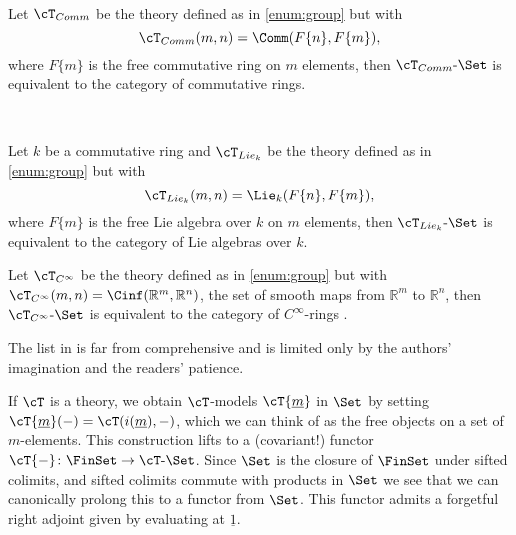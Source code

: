 \documentclass[leqno,oneside,english]{elsarticle}
\newcounter{enumisaved}
\newlength{\thmsaved}
\newlength{\thmnow}
\begin{document}
\begin{example}
\begin{enumerate}
{{{    \setcounter{thm}{{\strip@pt{\thmsaved}}}  
  }{
    
  }
  \setcounter{enumi}{\theenumisaved}
    \else  \fi
}}{}
  
    {{    {}  \ifshowcomplete
  \ 
  { \item Let $\cT_{Comm}$ be the theory defined as in \eqref{enum:group}
      but with 
      \[
      \cT_{Comm}(m,n)=\Comm(F\{n\},F\{m\}),
      \]
      where $F\{m\}$ is the free commutative ring on $m$ elements, then
      ${{\cT_{Comm}}\text{-}{\Set}}$ is equivalent to the category of commutative
      rings.
}
  {}
  \ 
  \ifthenelse{\lengthtest{\thmnow > \thmsaved}}{
    
    \setcounter{thm}{{\strip@pt{\thmsaved}}}  
  }{
    
  }
  \setcounter{enumi}{\theenumisaved}
    \else  \fi
}}{}
    
    \item Let $k$ be a commutative ring and $\cT_{Lie_k}$ be the theory
      defined as in \eqref{enum:group} but with 
      \[
      \cT_{Lie_k}(m,n)=\Lie_k(F\{n\},F\{m\}), 
      \]
      where $F\{m\}$ is the free Lie algebra over $k$ on $m$ elements,
      then ${{\cT_{Lie_k}}\text{-}{\Set}}$ is equivalent to the category of Lie
      algebras over $k$.

   \item Let $\cT_{C^\infty}$ be the theory defined as in
      \eqref{enum:group} but with
      $\cT_{C^\infty}(m,n)=\Cinf(\mathbb{R}^m,\mathbb{R}^n)$, the set of
      smooth maps from $\mathbb{R}^m$ to $\mathbb{R}^n$, then
      ${{\cT_{C^\infty}}\text{-}{\Set}}$ is equivalent to the category of
      $C^\infty$-rings \cite{Dub81,MoR91}.
    \end{enumerate}
  \end{example}

The list in  is far from comprehensive and is
limited only by the authors' imagination and the readers' patience.

If $\cT$ is a theory, we obtain $\cT$-models $\cT\{\underline{m}\}$ in
$\Set$ by setting $\cT\{\underline{m}\}(-)=\cT(i(\underline{m}),-)$, which
we can think of as the free objects on a set of $m$-elements. This
construction lifts to a (covariant!) functor $\cT\{-\}\colon \FinSet
\rightarrow {{\cT}\text{-}{\Set}}$. Since $\Set$ is the closure of $\FinSet$
under sifted colimits, and sifted colimits commute with products in
$\Set$ we see that we can canonically prolong this to a functor from
$\Set$. This functor admits a forgetful right adjoint given by
evaluating at $\underline{1}$.
\end{document}
